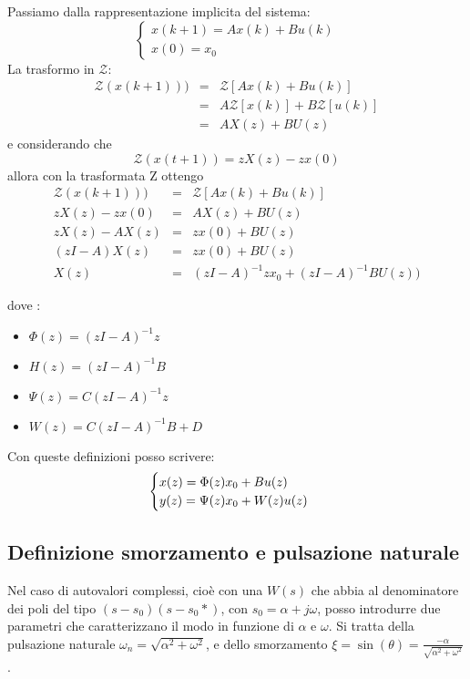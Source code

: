\documentclass{article}
\begin{document}
Passiamo dalla rappresentazione implicita del sistema:
\[\begin{cases}
    x(k+1)=Ax(k)+Bu(k)\\
    x(0)=x_0
\end{cases}
\]
La trasformo in $\mathcal{Z}$:
\[
    \begin{array}{rcl}
        \mathcal{Z} (x(k+1))) & = & \mathcal{Z} [Ax(k)+Bu(k)] \\
         & = & A\mathcal{Z}[x(k)]+B\mathcal{Z} [u(k)] \\
         & = & AX(z)+BU(z)
    \end{array}    
\]
e considerando che \[ \mathcal{Z}(x(t+1)) = zX(z)-zx(0) \]
allora con la trasformata Z ottengo 
\[
\begin{array}{rcl}
    \mathcal{Z} (x(k+1))) & = & \mathcal{Z} [Ax(k)+Bu(k)] \\
    zX(z)-zx(0) & = & AX(z)+BU(z)\\
    zX(z)-AX(z) & = & zx(0)+BU(z)\\
    (zI-A)X(z) & = & zx(0)+BU(z)\\
    X(z) & = & (zI-A)^{-1}zx_0+(zI-A)^{-1}BU(z))
\end{array}
\]

dove :
\begin{itemize}
    \item $\Phi(z)=(zI-A)^{-1}z$
    \item $H(z)=(zI-A)^{-1}B$
    \item $\Psi(z)=C(zI-A)^{-1}z$
    \item $W(z)=C(zI-A)^{-1}B+D$
\end{itemize}
Con queste definizioni posso scrivere:
\[
\begin{cases}
    x(z)=\Phi(z)x_0+Bu(z)\\
    y(z)=\Psi(z)x_0+W(z)u(z)
\end{cases}\\
\]


\subsection{Definizione smorzamento e pulsazione naturale}
Nel caso di autovalori complessi, cioè con una $W(s)$ che abbia  al denominatore 
dei poli del tipo $(s-s_0)(s-s_0*)$, con $s_0 = \alpha+j\omega$,
posso introdurre due parametri che caratterizzano il modo in funzione di $\alpha$ e $\omega$.
Si tratta della pulsazione naturale $\omega _n = \sqrt{\alpha^2 + \omega^2}$,
e dello smorzamento $\xi = \sin(\theta) = \frac{-\alpha}{\sqrt{\alpha^2 + \omega^2}} $.
\end{document}
